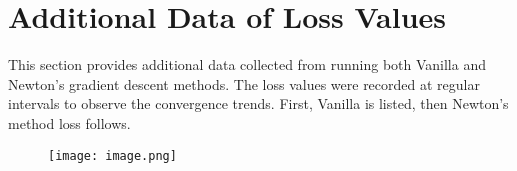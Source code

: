 \documentclass[12pt]{article}
\theoremstyle{definition}
\begin{document}
\section{Additional Data of Loss Values}
\label{sec:appendixB}
This section provides additional data collected from running both Vanilla and Newton's gradient descent methods. The loss values were recorded at regular intervals to observe the convergence trends. First, Vanilla is listed, then Newton's method loss follows.

\begin{figure}[h]
    \centering
    \texttt{[image: image.png]}
\end{figure}

% 
% 
\end{document}
